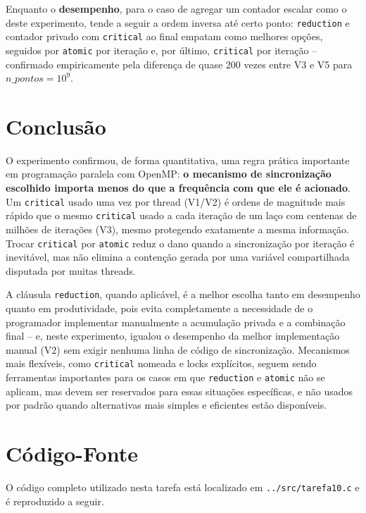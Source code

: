 \documentclass[a4paper,12pt]{article}
\begin{document}
Enquanto o \textbf{desempenho}, para o caso de agregar um contador
escalar como o deste experimento, tende a seguir a ordem inversa até
certo ponto: \texttt{reduction} e contador privado com
\texttt{critical} ao final empatam como melhores opções, seguidos por
\texttt{atomic} por iteração e, por último, \texttt{critical} por
iteração -- confirmado empiricamente pela diferença de quase 200
vezes entre V3 e V5 para $n\_pontos = 10^9$.

\section{Conclusão}

O experimento confirmou, de forma quantitativa, uma regra prática
importante em programação paralela com OpenMP: \textbf{o mecanismo de
sincronização escolhido importa menos do que a frequência com que ele
é acionado}. Um \texttt{critical} usado uma vez por thread (V1/V2) é
ordens de magnitude mais rápido que o mesmo \texttt{critical} usado a
cada iteração de um laço com centenas de milhões de iterações (V3),
mesmo protegendo exatamente a mesma informação. Trocar
\texttt{critical} por \texttt{atomic} reduz o dano quando a
sincronização por iteração é inevitável, mas não elimina a contenção
gerada por uma variável compartilhada disputada por muitas threads.

A cláusula \texttt{reduction}, quando aplicável, é a melhor escolha
tanto em desempenho quanto em produtividade, pois evita completamente
a necessidade de o programador implementar manualmente a
acumulação privada e a combinação final -- e, neste experimento,
igualou o desempenho da melhor implementação manual (V2) sem exigir
nenhuma linha de código de sincronização. Mecanismos mais
flexíveis, como \texttt{critical} nomeada e locks explícitos, seguem
sendo ferramentas importantes para os casos em que \texttt{reduction}
e \texttt{atomic} não se aplicam, mas devem ser reservados para essas
situações específicas, e não usados por padrão quando alternativas
mais simples e eficientes estão disponíveis.

\newpage

\appendix
\section{Código-Fonte}

O código completo utilizado nesta tarefa está localizado em
\texttt{../src/tarefa10.c} e é reproduzido a seguir.


\end{document}
